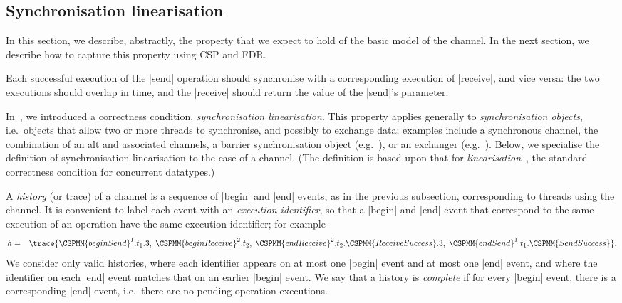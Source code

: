 \inlineCSP

\subsection{Synchronisation linearisation}
\label{sec:syncchan-analysis-1}

In this section, we describe, abstractly, the property that we expect to hold
of the basic model of the channel.  In the next section, we describe how to
capture this property using CSP and FDR.

Each successful execution of the |send| operation should synchronise with a
corresponding execution of |receive|, and vice versa: the two executions
should overlap in time, and the |receive| should return the value of the
|send|'s parameter.  

In~\cite{LL:synchronisation}, we introduced a correctness condition,
\emph{synchronisation linearisation}.  This property applies generally
to \emph{synchronisation objects}, i.e.~objects that allow two or more threads
to synchronise, and possibly to exchange data; examples include a synchronous
channel, the combination of an alt and associated channels, a barrier
synchronisation object (e.g.~\cite{andrews}), or an exchanger
(e.g.~\cite{Herlihy-Shavit}).  Below, we specialise the definition of
synchronisation linearisation to the case of a channel.  (The definition is
based upon that for
\emph{linearisation}~\cite{herlihy-wing}, the standard correctness condition
for concurrent datatypes.)  

A \emph{history} (or trace) of a channel is a sequence of |begin| and |end|
events, as in the previous subsection, corresponding to threads using the
channel.  It is convenient to label each event with an \emph{execution
identifier}, so that a |begin| and |end| event that correspond to the same
execution of an operation have the same execution identifier; for example
\begin{eqnarray*}
h & = & 
\trace{\CSPMM{beginSend}^1.t_1.3,\; \CSPMM{beginReceive}^2.t_2,\;
  \CSPMM{endReceive}^2.t_2.\CSPMM{ReceiveSuccess}.3,\; 
  \CSPMM{endSend}^1.t_1.\CSPMM{SendSuccess} }.
\end{eqnarray*}
We consider only valid histories, where each identifier appears on at most one
|begin| event and at most one |end| event, and where the identifier on each
|end| event matches that on an earlier |begin| event.  We say that a history
is \emph{complete} if for every |begin| event, there is a corresponding |end|
event, i.e.~there are no pending operation executions.

